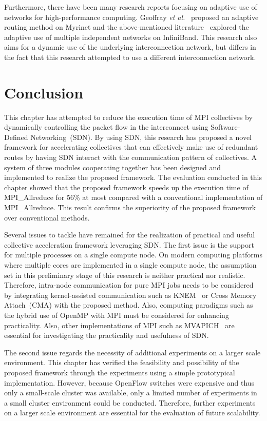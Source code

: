 Furthermore, there have been many research reports focusing on adaptive
use of networks for high-performance computing. Geoffray \emph{et
al.}~\autocite{Geoffray2008} proposed an adaptive routing method on Myrinet
and the above-mentioned literature~\autocite{Jiuxing2004} explored the
adaptive use of multiple independent networks on InfiniBand. This research also
aims for a dynamic use of the underlying interconnection network, but differs
in the fact that this research attempted to use a different interconnection
network.

\section{Conclusion}\label{sec:iii-conclusion}

This chapter has attempted to reduce the execution time of MPI
collectives by dynamically controlling the packet flow in the interconnect
using Software-Defined Networking~(SDN).
By using SDN, this research  has proposed a novel framework for accelerating
collectives that can effectively make use of redundant routes by having SDN
interact with the communication pattern of collectives. A system of three
modules cooperating together has been designed and implemented to realize the
proposed framework. The evaluation conducted in this chapter showed that the
proposed framework speeds up the execution time of MPI\_Allreduce for 56\% at
most compared with a conventional implementation of MPI\_Allreduce. This
result confirms the superiority of the proposed framework over conventional
methods.

Several issues to tackle have remained for the realization of practical
and useful collective acceleration framework leveraging SDN\@.
The first issue is the support for multiple processes on a single compute
node. On modern computing platforms where multiple cores are implemented in a
single compute node, the assumption set in this preliminary stage of this
research is neither practical nor realistic. Therefore, intra-node
communication for pure MPI jobs needs to be considered by integrating
kernel-assisted communication such as KNEM~\autocite{Goglin2013} or Cross
Memory Attach~(CMA) with the proposed method. Also, computing paradigms such
as the hybrid use of OpenMP with MPI must be considered for enhancing
practicality. Also, other implementations of MPI such as
MVAPICH~\autocite{mvapich} are essential for investigating the practicality
and usefulness of SDN\@.

The second issue regards the necessity of additional experiments on a
larger scale environment. This chapter has verified the feasibility and
possibility of the proposed framework through the experiments using a simple
prototypical implementation. However, because OpenFlow switches were expensive
and thus only a small-scale cluster was available, only a limited number of
experiments in a small cluster environment could be conducted. Therefore,
further experiments on a larger scale environment are essential for the
evaluation of future scalability.

